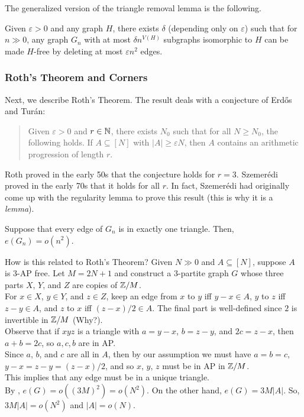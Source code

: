 			The generalized version of the triangle removal lemma is the following.

			\begin{ftheo}
				Given $\varepsilon>0$ and any graph $H$, there exists $\delta$ (depending only on $\varepsilon$) such that for $n\gg 0$, any graph $G_n$ with at most $\delta n^{V(H)}$ subgraphs isomorphic to $H$ can be made $H$-free by deleting at most $\varepsilon n^2$ edges.
			\end{ftheo}

		\subsubsection{Roth's Theorem and Corners}

			Next, we describe Roth's Theorem. The result deals with a conjecture of Erd\H{o}s and Tur\'{a}n:
			\begin{quote}
				Given $\varepsilon > 0$ and $r\in\mathbb{N}$, there exists $N_0$ such that for all $N \ge N_0$, the following holds. If $A \subseteq [N]$ with $|A| \ge \varepsilon N$, then $A$ contains an arithmetic progression of length $r$. 
			\end{quote}

			Roth proved in the early 50s that the conjecture holds for $r=3$. Szemer\'{e}di proved in the early 70s that it holds for all $r$. In fact, Szemer\'{e}di had originally come up with the regularity lemma to prove this result (this is why it is a \emph{lemma}).

			\begin{flem}
				\label{lemma: roth's theorem edge in unique triangle}
				Suppose that every edge of $G_n$ is in exactly one triangle. Then, $e(G_n) = o(n^2)$.
			\end{flem}

			How is this related to Roth's Theorem? Given $N\gg 0$ and $A\subseteq[N]$, suppose $A$ is $3$-AP free. Let $M = 2N+1$ and construct a $3$-partite graph $G$ whose three parts $X$, $Y$, and $Z$ are copies of $\mathbb{Z}/M$.\\
			For $x\in X$, $y\in Y$, and $z\in Z$, keep an edge from $x$ to $y$ iff $y-x \in A$, $y$ to $z$ iff $z-y \in A$, and $z$ to $x$ iff $(z-x)/2 \in A$. The final part is well-defined since $2$ is invertible in $\mathbb{Z}/M$ (Why?). \\
			Observe that if $xyz$ is a triangle with $a = y-x$, $b = z-y$, and $2c = z-x$, then $a+b=2c$, so $a,c,b$ are in AP.\\
			Since $a$, $b$, and $c$ are all in $A$, then by our assumption we must have $a=b=c$, $y-x=z-y=(z-x)/2$, and so $x$, $y$, $z$ must be in AP in $\mathbb{Z}/M$.\\
			This implies that any edge must be in a unique triangle.\\
			By , $e(G) = o((3M)^2) = o(N^2)$. On the other hand, $e(G) = 3M|A|$. So, $3M|A| = o(N^2)$ and $|A| = o(N)$.

